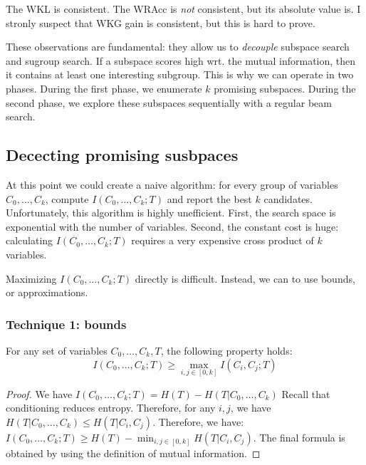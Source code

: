 \begin{lemma}
    The WKL is consistent. The WRAcc is \emph{not} consistent, but its absolute value
    is. I stronly suspect that WKG gain is consistent, but this is hard to
    prove.
\end{lemma}

These observations are fundamental: they allow us to \emph{decouple} subspace search and
sugroup search. If a subspace scores high wrt. the mutual information, then it
contains at least one interesting subgroup. This is why we can operate in two
phases. During the first phase, we enumerate $k$ promising subspaces. During the
second phase, we explore these subspaces sequentially with a regular beam
search.

\subsection{Dececting promising susbpaces}

At this point we could create a naive algorithm: for every group of variables
$C_0, \ldots,C_k$, compute $I(C_0, \ldots, C_k; T)$ and report the best $k$
candidates.
Unfortunately, this algorithm is highly unefficient. First, the search space is
exponential with the number of variables. Second, the constant cost is huge:
calculating $I(C_0, \ldots, C_k; T)$ requires a very expensive cross product of
$k$ variables.

Maximizing $I(C_0, \ldots, C_k; T)$ directly is difficult.  Instead, we can
to use bounds, or approximations.

\subsubsection{Technique 1: bounds}

\begin{lemma}
    For any set of variables $C_0, \ldots, C_k, T$, the following property holds:
    $$
        I(C_0, \ldots, C_k; T) \geq \max_{i,j\in [0,k]} I(C_i, C_j ; T)
    $$
\end{lemma}

\begin{proof}
    We have $I(C_0, \ldots, C_k; T) = H(T) - H(T|C_0, \ldots, C_k)$ Recall that
    conditioning reduces entropy. Therefore, for any $i,j$, we have $H(T|C_0,
    \ldots, C_k) \leq H(T |C_i, C_j)$. Therefore, we have:
    $I(C_0, \ldots, C_k; T) \geq H(T) - \min_{i,j\in [0,k]} H(T | C_i, C_j)$.
    The final formula is obtained by using the definition of mutual
    information.
\end{proof}

